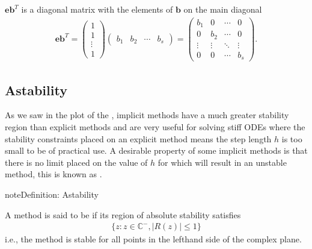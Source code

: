 \documentclass[letterpaper,10pt,english]{jupyterBook}
\begin{document}
\sphinxAtStartPar
\(\mathbf{e}\mathbf{b}^T\) is a diagonal matrix with the elements of \(\mathbf{b}\) on the main diagonal
\begin{align*}
    \mathbf{e}\mathbf{b}^T = 
    \begin{pmatrix} 1 \\ 1 \\ \vdots \\ 1 \end{pmatrix}
    \begin{pmatrix} b_1 & b_2 & \cdots & b_s \end{pmatrix} 
    = \begin{pmatrix}
        b_1 & 0 & \cdots & 0 \\
        0 & b_2 & \cdots & 0 \\
        \vdots & \vdots & \ddots & \vdots \\
        0 & 0 & \cdots & b_s
    \end{pmatrix}.
\end{align*}

\subsection{A\sphinxhyphen{}stability}
\label{\detokenize{4_Stability/4.3_IRK_stability_function:a-stability}}\label{\detokenize{4_Stability/4.3_IRK_stability_function:id1}}
\sphinxAtStartPar
As we saw in the plot of the {\hyperref[\detokenize{4_Stability/4.3_IRK_stability_function:euler-stability-region-figure}]{}}, implicit methods have a much greater stability region than explicit methods and are very useful for solving stiff ODEs where the stability constraints placed on an explicit method means the step length \(h\) is too small to be of practical use. A desirable property of some implicit methods is that there is no limit placed on the value of \(h\) for which will result in an unstable method, this is known as .

\begin{sphinxadmonition}{note}{Definition: A\sphinxhyphen{}stability}

\sphinxAtStartPar
A method is said to be  if its region of absolute stability satisfies
\begin{align*}
    \{ z : z \in {\mathbb{C}}^- ,|R(z)| \leq 1\}
\end{align*}
\sphinxAtStartPar
i.e., the method is stable for all points in the left\sphinxhyphen{}hand side of the complex plane.
\end{sphinxadmonition}
\end{document}
